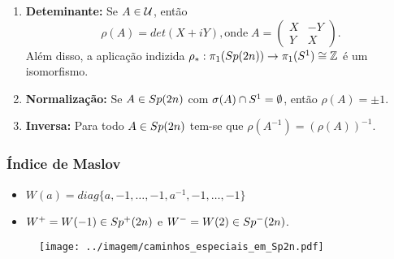 \documentclass{beamer}
\begin{document}
\begin{footnotesize}
\begin{frame}
\begin{scriptsize}
\begin{enumerate}
			
			\item \textbf{Deteminante:} Se $A\in \mathcal{U}$, então 
			$$
			\rho(A) = det(X+iY), \text{onde} \;	
			A=\left(
			\begin{array}{cc}
			X & -Y					\\
			Y & X
			\end{array}
			\right).
			$$
			Além disso, a aplicação indizida $\rho_{*}: \pi_{1}(Sp(2n)) \to \pi_{1}(S^{1}) \cong \mathbb{Z}$ é um isomorfismo.
			
			\item \textbf{Normalização:} Se $A \in Sp(2n)$ com $\sigma(A)\cap S^{1} = \emptyset$, então $\rho(A) = \pm 1$.
			
			
			\item  \textbf{Inversa:} Para todo $A \in Sp(2n)$ tem-se que $\rho(A^{-1})=(\rho(A))^{-1}$. 
			
			\end{enumerate}
		\end{scriptsize}
	\end{frame}
	
		\begin{frame}
			\frametitle{Índice de Maslov}
			\begin{scriptsize}
				
				\begin{minipage}[t]{0.5\linewidth}
					\begin{itemize}
						\item $W(a) = diag\{a,-1,\dots,-1, a^{-1},-1,\dots,-1\}$
						
					\end{itemize}
				\end{minipage}
				\begin{minipage}[t]{0.4\linewidth}
					\begin{itemize}
						\item $W^{+}=W(-1) \in  Sp^{+}(2n)$ e $W^{-} = W(2)\in Sp^{-}(2n)$.
						
					\end{itemize}
				\end{minipage}
				
			\begin{minipage}[t]{0.5\linewidth}
				\begin{figure}[!h]
					\centering
					\texttt{[image: ../imagem/caminhos\_especiais\_em\_Sp2n.pdf]}
				\end{figure}
			\end{minipage}
			\hfill%
			\begin{minipage}[t]{0.3\linewidth}
				

\end{minipage}
\end{scriptsize}
\end{frame}
\end{footnotesize}
\end{document}
